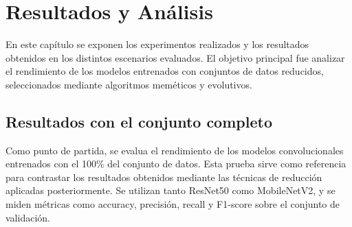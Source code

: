 
\chapter{Resultados y Análisis}\label{ch:resultados-y-analisis}
En este capítulo se exponen los experimentos realizados y los resultados obtenidos en los distintos escenarios evaluados.
El objetivo principal fue analizar el rendimiento de los modelos entrenados con conjuntos de datos reducidos,
seleccionados mediante algoritmos meméticos y evolutivos.


\section{Resultados con el conjunto completo}\label{sec:resultados-conjunto-completo}
Como punto de partida, se evalua el rendimiento de los modelos convolucionales entrenados con el 100\% del conjunto de datos.
Esta prueba sirve como referencia para contrastar los resultados obtenidos mediante las técnicas de reducción aplicadas posteriormente.
Se utilizan tanto ResNet50 como MobileNetV2, y se miden métricas como accuracy, precisión, recall y F1-score sobre el conjunto de validación.

\begin{table}[htp]
    \centering
    \caption{Comparativa de resultados del \textbf{100\%} con los modelos \textbf{ResNet50} y \textbf{MobileNet}.}
    \label{tab:resultados-100-resnet50-mobilenet}
\end{table}

